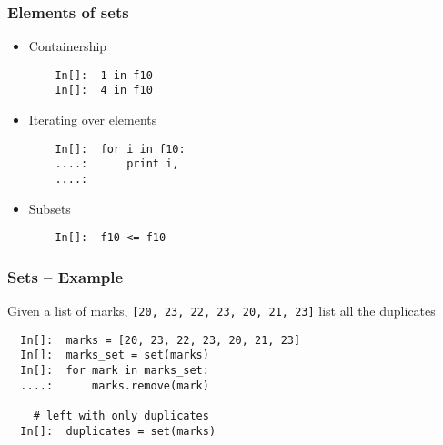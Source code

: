\begin{frame}[fragile]
  \frametitle{Elements of sets}
  \begin{itemize}
  \item Containership
    \begin{lstlisting}
    In[]:  1 in f10
    In[]:  4 in f10
    \end{lstlisting}
  \item Iterating over elements
    \begin{lstlisting}
    In[]:  for i in f10:
    ....:      print i,
    ....:
    \end{lstlisting}
  \item Subsets
    \begin{lstlisting}
    In[]:  f10 <= f10
    \end{lstlisting}
  \end{itemize}
\end{frame}

\begin{frame}[fragile]
  \frametitle{Sets -- Example}
  \begin{block}{}
    Given a list of marks, \texttt{[20, 23, 22, 23, 20, 21, 23]} list
    all the duplicates
  \end{block}
  \begin{lstlisting}
  In[]:  marks = [20, 23, 22, 23, 20, 21, 23] 
  In[]:  marks_set = set(marks)
  In[]:  for mark in marks_set:
  ....:      marks.remove(mark)

    # left with only duplicates
  In[]:  duplicates = set(marks)
  \end{lstlisting}
\end{frame}

